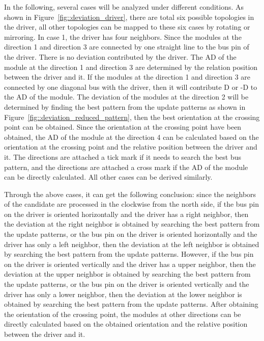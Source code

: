 In the following, several cases will be analyzed under different conditions.
As shown in Figure~\ref{fig::deviation_driver}, there are total six possible topologies
in the driver, all other topologies can be mapped to these six cases by rotating or mirroring.
In case 1, the driver has four neighbors.
Since the modules at the direction 1 and direction 3 are connected by one straight line to
the bus pin of the driver. There is no deviation contributed by the driver.
The AD of the module at the direction 1 and direction 3 are determined by the relation position between the driver and it.
If the modules at the direction 1 and direction 3 are connected by one diagonal bus with the driver, then it will contribute D or -D to the AD of the module.
The deviation of the modules at the direction 2 will be determined by finding the best
pattern from the update patterns as shown in Figure~\ref{fig::deviation_reduced_pattern},
then the best orientation at the crossing point can be obtained.
Since the orientation at the crossing point have been obtained, the AD of the module at the direction 4
can be calculated based on the orientation at the crossing point
and the relative position between the driver and it.
The directions are attached a tick mark if it needs to search the best bus pattern,
and the directions are attached a cross mark if the AD of the module can be directly calculated.
All other cases can be derived similarly.

Through the above cases, it can get the following conclusion:
since the neighbors of the candidate are processed in the clockwise from the north side,
if the bus pin on the driver is oriented horizontally and the driver has a right neighbor,
then the deviation at the right neighbor is obtained by searching the best pattern from the update patterns,
or the bus pin on the driver is oriented horizontally and the driver has only a left neighbor,
then the deviation at the left neighbor is obtained by searching the best pattern from the update patterns.
However, if the bus pin on the driver is oriented vertically and the driver has a upper neighbor,
then the deviation at the upper neighbor is obtained by searching the best pattern from the update patterns,
or the bus pin on the driver is oriented vertically and the driver has only a lower neighbor,
then the deviation at the lower neighbor is obtained by searching the best pattern from the update patterns.
After obtaining the orientation of the crossing point, the modules at other directions can be directly calculated
based on the obtained orientation and the relative position between the driver and it.

